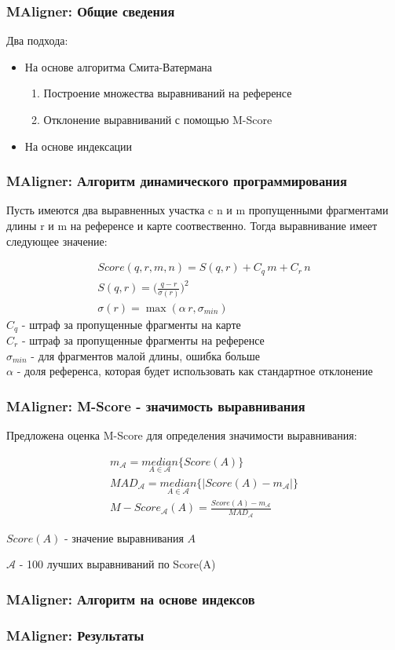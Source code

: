 \begin{frame}
\frametitle{MAligner: Общие сведения}
Два подхода:
\begin{itemize}
  \item На основе алгоритма Смита-Ватермана
  \begin{enumerate}
    \item Построение множества выравниваний на референсе
    \item Отклонение выравниваний с помощью M-Score
  \end{enumerate}
  \item На основе индексации
\end{itemize}
\end{frame}

\begin{frame}
\frametitle{MAligner: Алгоритм динамического программирования}

Пусть имеются два выравненных участка c n и m пропущенными фрагментами длины r и m на референсе и карте соотвественно.
Тогда выравнивание имеет следующее значение:

\begin{gather*}
Score(q, r, m, n) = S(q, r) + C_q \,m + C_r \, n \\
S(q, r) = \bigg(\frac{q - r}{\sigma(r)}\bigg)^2 \\
\sigma(r) = \max(\alpha \, r, \sigma_{min})
\end{gather*}
$C_q$ - штраф за пропущенные фрагменты на карте \\
$C_r$ - штраф за пропущенные фрагменты на референсе \\
$\sigma_{min}$ - для фрагментов малой длины, ошибка больше \\
$\alpha$ - доля референса, которая будет использовать как стандартное отклонение
\end{frame}

\begin{frame}
\frametitle{MAligner: M-Score - значимость выравнивания}

Предложена оценка M-Score для определения значимости выравнивания:

\begin{gather*}
  m_{\mathcal{A}} = \underset{A \in \mathcal{A}}{median}\{Score(A)\} \\
  MAD_{\mathcal{A}} = \underset{A \in \mathcal{A}}{median}\{ | Score(A) - m_{\mathcal{A}}|\} \\
  M-Score_{\mathcal{A}}(A) = \frac{Score(A) - m_{\mathcal{A}}}{MAD_{\mathcal{A}}}
\end{gather*}

$Score(A)$ - значение выравнивания $A$

$\mathcal{A}$ - 100 лучших выравниваний по Score(A)
\end{frame}


\begin{frame}
\frametitle{MAligner: Алгоритм на основе индексов}

\end{frame}

\begin{frame}
\frametitle{MAligner: Результаты}

\end{frame}
